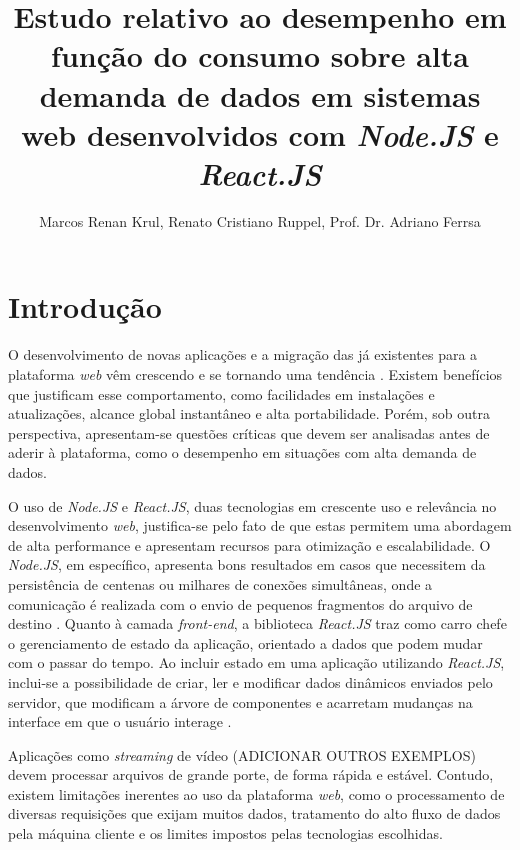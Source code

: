 \documentclass[12pt]{article}
\title{Estudo relativo ao desempenho em função do consumo sobre alta demanda de dados em sistemas web desenvolvidos com \textit{Node.JS} e \textit{React.JS}}
\author{Marcos Renan Krul\inst{1}, Renato Cristiano Ruppel\inst{1}, Prof. Dr. Adriano Ferrsa\inst{1}}
\begin{document}
 

\maketitle


\begin{resumo} 
\end{resumo}


\begin{abstract} 
\end{abstract}


\section{Introdução}

O desenvolvimento de novas aplicações e a migração das já existentes para a plataforma \textit{web} 
vêm crescendo e se tornando uma tendência \cite{SOUZAB}. Existem benefícios que justificam esse comportamento,
como facilidades em instalações e atualizações, alcance global instantâneo e alta portabilidade. Porém,
sob outra perspectiva, apresentam-se questões críticas que devem ser analisadas antes de aderir à plataforma, como
o desempenho em situações com alta demanda de dados.

O uso de \textit{Node.JS} e \textit{React.JS}, duas tecnologias em crescente uso e relevância no
desenvolvimento \textit{web}, justifica-se pelo fato de que estas permitem uma abordagem de alta
performance e apresentam recursos para otimização e escalabilidade. O \textit{Node.JS}, em específico, apresenta
bons resultados em casos que necessitem da persistência de centenas ou milhares de conexões
simultâneas, onde a comunicação é realizada com o envio de pequenos fragmentos do arquivo de destino
\cite[p. 112]{EJSMONT}. Quanto à camada \textit{front-end}, a biblioteca \textit{React.JS} traz como
carro chefe o gerenciamento de estado da aplicação, orientado a dados que podem mudar com o passar do tempo.
Ao incluir estado em uma aplicação utilizando \textit{React.JS}, inclui-se a possibilidade de criar, ler
e modificar dados dinâmicos enviados pelo servidor, que modificam a árvore de componentes e acarretam 
mudanças na interface em que o usuário interage \cite[p. 97]{BANKSEPORCELLO}.

Aplicações como \textit{streaming} de vídeo (ADICIONAR OUTROS EXEMPLOS) devem processar arquivos de 
grande porte, de forma rápida e estável. Contudo, existem limitações inerentes ao uso da 
plataforma \textit{web}, como o processamento de diversas requisições que exijam muitos dados, 
tratamento do alto fluxo de dados pela máquina cliente e os limites impostos pelas tecnologias escolhidas.
\end{document}
